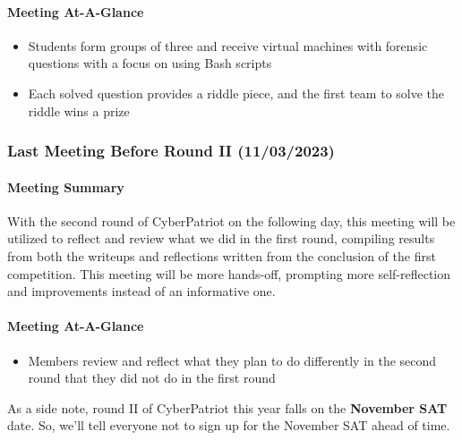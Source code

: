 \documentclass[
  letterpaper,
  DIV=11,
  numbers=noendperiod]{scrartcl}
\let\oldparagraph\paragraph
\renewcommand{\paragraph}[1]{\oldparagraph{#1}\mbox{}}
\providecommand{\tightlist}{%
  \setlength{\itemsep}{0pt}\setlength{\parskip}{0pt}}\usepackage{longtable,booktabs,array}
\begin{document}
\hypertarget{meeting-at-a-glance-6}{%
\paragraph{Meeting At-A-Glance}\label{meeting-at-a-glance-6}}

\begin{itemize}
\tightlist
\item
  Students form groups of three and receive virtual machines with
  forensic questions with a focus on using Bash scripts
\item
  Each solved question provides a riddle piece, and the first team to
  solve the riddle wins a prize
\end{itemize}

\hypertarget{last-meeting-before-round-ii-11032023}{%
\subsubsection{Last Meeting Before Round II
(11/03/2023)}\label{last-meeting-before-round-ii-11032023}}

\hypertarget{meeting-summary-7}{%
\paragraph{Meeting Summary}\label{meeting-summary-7}}

With the second round of CyberPatriot on the following day, this meeting
will be utilized to reflect and review what we did in the first round,
compiling results from both the writeups and reflections written from
the conclusion of the first competition. This meeting will be more
hands-off, prompting more self-reflection and improvements instead of an
informative one.

\hypertarget{meeting-at-a-glance-7}{%
\paragraph{Meeting At-A-Glance}\label{meeting-at-a-glance-7}}

\begin{itemize}
\tightlist
\item
  Members review and reflect what they plan to do differently in the
  second round that they did not do in the first round
\end{itemize}

As a side note, round II of CyberPatriot this year falls on the
\textbf{November SAT} date. So, we'll tell everyone not to sign up for
the November SAT ahead of time.
\end{document}
